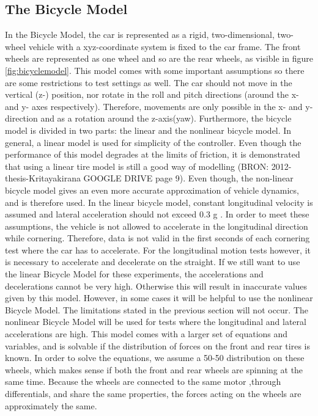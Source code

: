 \subsection{The Bicycle Model}
In the Bicycle Model, the car is represented as a rigid, two-dimensional, two-wheel vehicle with a xyz-coordinate system is fixed to the car frame. The front wheels are represented as one wheel and so are the rear wheels, as visible in figure \ref{fig:bicyclemodel}. This model comes with some important assumptions so there are some restrictions to test settings as well. The car should not move in the vertical (z-) position, nor rotate in the roll and pitch directions (around the x- and y- axes respectively). Therefore, movements are only possible in the x- and y-direction and as a rotation around the z-axis(yaw). 
	Furthermore, the bicycle model is divided in two parts: the linear and the nonlinear bicycle model. In general, a linear model is used for simplicity of the controller. Even though the performance of this model degrades at the limits of friction, it is demonstrated that using a linear tire model is still a good way of modelling (BRON: 2012-thesis-Kritayakirana GOOGLE DRIVE page 9). Even though, the non-linear bicycle model gives an even more accurate approximation of vehicle dynamics, and is therefore used.
	In the linear bicycle model, constant longitudinal velocity is assumed and lateral acceleration should not exceed 0.3 g . In order to meet these assumptions, the vehicle is not allowed to accelerate in the longitudinal direction while cornering. Therefore, data is not valid in the first seconds of each cornering test where the car has to accelerate. For the longitudinal motion tests however, it is necessary to accelerate and decelerate on the straight. If we still want to use the linear Bicycle Model for these experiments, the accelerations and decelerations cannot be very high. Otherwise this will result in inaccurate values given by this model.
	However, in some cases it will be helpful to use the nonlinear Bicycle Model. The limitations stated in the previous section will not occur. The nonlinear Bicycle Model will be used for tests where the longitudinal and lateral accelerations are high. This model comes with a larger set of equations and variables, and is solvable if the distribution of forces on the front and rear tires is known. In order to solve the equations, we assume a 50-50 distribution on these wheels, which makes sense if both the front and rear wheels are spinning at the same time. Because the wheels are connected to the same motor ,through differentials, and share the same properties, the forces acting on the wheels are approximately the same. 
	
